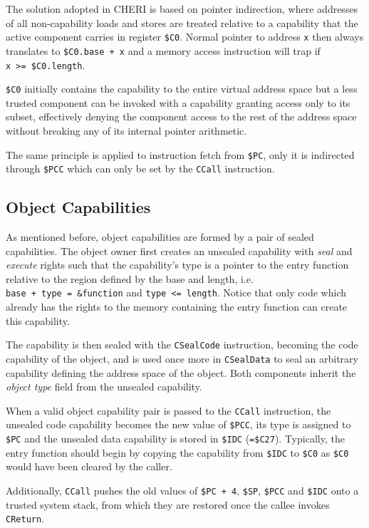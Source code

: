 \documentclass[a4paper,12pt,twoside,openright]{report}
\newcommand{\reg}[1]{\texttt{\$#1}}
\newcommand{\insn}[1]{\texttt{#1}}
\begin{document}
The solution adopted in CHERI is based on pointer indirection, where addresses of all non-capability loads and stores are treated relative to a capability that the active component carries in register \reg{C0}. Normal pointer to address \texttt{x} then always translates to \texttt{\reg{C0}.base~+~x} and a memory access instruction will trap if \texttt{x~>=~\reg{C0}.length}. 

\reg{C0} initially contains the capability to the entire virtual address space but a less trusted component can be invoked with a capability granting access only to its subset, effectively denying the component access to the rest of the address space without breaking any of its internal pointer arithmetic.

The same principle is applied to instruction fetch from \reg{PC}, only it is indirected through \reg{PCC} which can only be set by the \insn{CCall} instruction.

\subsection{Object Capabilities}

As mentioned before, object capabilities are formed by a pair of sealed capabilities. The object owner first creates an unsealed capability with \emph{seal} and \emph{execute} rights such that the capability's type is a pointer to the entry function relative to the region defined by the base and length, i.e. \texttt{base~+~type~=~\&function} and \texttt{type~<=~length}. Notice that only code which already has the rights to the memory containing the entry function can create this capability. 

The capability is then sealed with the \insn{CSealCode} instruction, becoming the code capability of the object, and is used once more in \insn{CSealData} to seal an arbitrary capability defining the address space of the object. Both components inherit the \emph{object type} field from the unsealed capability.

When a valid object capability pair is passed to the \insn{CCall} instruction, the unsealed code capability becomes the new value of \reg{PCC}, its type is assigned to \reg{PC} and the unsealed data capability is stored in \reg{IDC} (\texttt{=\reg{C27}}). Typically, the entry function should begin by copying the capability from \reg{IDC} to \reg{C0} as \reg{C0} would have been cleared by the caller.

Additionally, \insn{CCall} pushes the old values of \texttt{\reg{PC}~+~4}, \reg{SP}, \reg{PCC} and \reg{IDC} onto a trusted system stack, from which they are restored once the callee invokes \insn{CReturn}.
\end{document}
